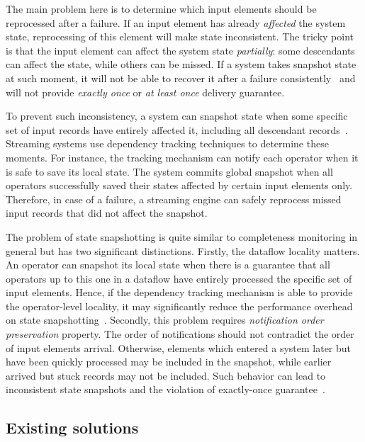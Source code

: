 The main problem here is to determine which input elements should be reprocessed after a failure. If an input element has already {\em affected} the system state, reprocessing of this element will make state inconsistent. The tricky point is that the input element can affect the system state {\em partially}: some descendants can affect the state, while others can be missed. If a system takes snapshot state at such moment, it will not be able to recover it after a failure consistently~\cite{2015arXiv150608603C} and will not provide {\em exactly once} or {\em at least once} delivery guarantee.

To prevent such inconsistency, a system can snapshot state when some specific set of input records have entirely affected it, including all descendant records~\cite{2015arXiv150608603C, thepaper}. Streaming systems use dependency tracking techniques to determine these moments. For instance, the tracking mechanism can notify each operator when it is safe to save its local state. The system commits global snapshot when all operators successfully saved their states affected by certain input elements only. Therefore, in case of a failure, a streaming engine can safely reprocess missed input records that did not affect the snapshot.

The problem of state snapshotting is quite similar to completeness monitoring in general but has two significant distinctions. Firstly, the dataflow locality matters. An operator can snapshot its local state when there is a guarantee that all operators up to this one in a dataflow have entirely processed the specific set of input elements. Hence, if the dependency tracking mechanism is able to provide the operator-level locality, it may significantly reduce the performance overhead on state snapshotting~\cite{Carbone:2017:SMA:3137765.3137777}. Secondly, this problem requires {\em notification order preservation} property. The order of notifications should not contradict the order of input elements arrival. Otherwise, elements which entered a system later but have been quickly processed may be included in the snapshot, while earlier arrived but stuck records may not be included. Such behavior can lead to inconsistent state snapshots and the violation of exactly-once guarantee~\cite{2015arXiv150608603C}. 

\subsection{Existing solutions} \label{existing_solutions}

